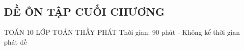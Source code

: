 \subsection{ĐỀ ÔN TẬP CUỐI CHƯƠNG}

\begin{name}
	{\tenchude}
	{TOÁN 10}
	{LỚP TOÁN THẦY PHÁT}
	{Thời gian: 90 phút - Không kể thời gian phát đề}
\end{name}

